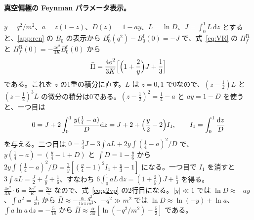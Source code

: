 \documentclass[a4paper,10pt]{ltjsarticle}
\newcommand{\dd}{\mathrm{d}}
\begin{document}
\paragraph{真空偏極の Feynman パラメータ表示。}$y=q^2/m^2$、$a=z(1-z)$、$D(z)=1-ay$、$L=\ln D$、$J=\int_0^1L\,\dd z$ とすると、\ref{app:ren} の $B_0$ の表示から $B_0^{\mathrm f}(q^2)-B_0^{\mathrm f}(0)=-J$ で、式~\eqref{eq:VR} の $\Pi_f^{\mathrm R}$ と $\Pi_f^{\mathrm R}(0)=-\frac{4e^2}{3K}B_0^{\mathrm f}(0)$ から
\begin{equation*}
\bar\Pi=\frac{4e^2}{3K}\Bigl[\Bigl(1+\frac2y\Bigr)J+\frac13\Bigr]
\end{equation*}
である。これを $z$ の1重の積分に直す。$L$ は $z=0,1$ で0なので、$(z-\frac12)L$ と $(z-\frac12)^3L$ の微分の積分は0である。$(z-\frac12)^2=\frac14-a$ と $ay=1-D$ を使うと、一つ目は
\begin{equation*}
0=J+2\int_0^1\frac{y(\frac14-a)}{D}\dd z=J+2+\Bigl(\frac y2-2\Bigr)I_1,\qquad I_1=\int_0^1\frac{\dd z}{D}
\end{equation*}
を与える。二つ目は $0=\frac34J-3\int aL+2y\int(\frac14-a)^2/D$ で、$y(\frac14-a)=(\frac y4-1+D)$ と $\int D=1-\frac y6$ から $2y\int(\frac14-a)^2/D=\frac2y[(\frac y4-1)^2I_1+\frac y3-1]$ になる。一つ目で $I_1$ を消すと $3\int aL=\frac J2+\frac Jy+\frac16$、すなわち $6\int_0^1aL\,\dd z=(1+\frac2y)J+\frac13$ を得る。$\frac{4e^2}{3K}\cdot6=\frac{8e^2}{K}=\frac{2\alpha}{\pi}$ なので、式~\eqref{eq:g2vp} の2行目になる。$|y|\ll1$ では $\ln D\approx-ay$、$\int a^2=\frac1{30}$ から $\bar\Pi\approx-\frac{\alpha}{15\pi}\frac{q^2}{m^2}$、$-q^2\gg m^2$ では $\ln D\approx\ln(-y)+\ln a$、$\int a\ln a\,\dd z=-\frac5{18}$ から $\bar\Pi\approx\frac{\alpha}{3\pi}[\ln(-q^2/m^2)-\frac53]$ である。
\end{document}
